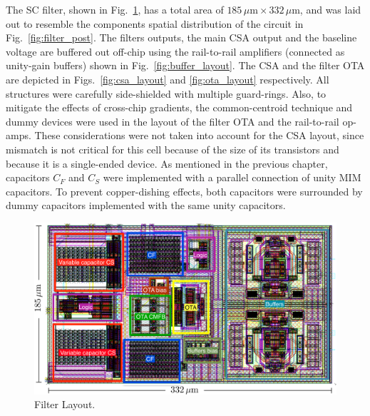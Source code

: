 The SC filter, shown in Fig.~\ref{fig:filter_layout}, has a total area of $185\,\mu\text{m}\times 332\,\mu\text{m}$, and was laid out to resemble the components spatial distribution of the circuit in Fig.~\ref{fig:filter_post}. The filters outputs, the main CSA output and the baseline voltage are buffered out off-chip using the rail-to-rail amplifiers (connected as unity-gain buffers) shown in Fig.~\ref{fig:buffer_layout}. The CSA and the filter OTA are depicted in Figs.~\ref{fig:csa_layout} and \ref{fig:ota_layout} respectively. All structures were carefully side-shielded with multiple guard-rings. Also, to mitigate the effects of cross-chip gradients,  the \mbox{common-centroid} technique and dummy devices were used in the layout of the filter OTA and the rail-to-rail op-amps. These considerations were not taken into account for the CSA layout, since mismatch is not critical for this cell because of the size of its transistors and because it is a single-ended device. As mentioned in the previous chapter, capacitors $C_F$ and $C_S$ were implemented with a parallel connection of unity MIM capacitors. To prevent copper-dishing effects, both capacitors were surrounded by dummy capacitors implemented with the same unity capacitors.

\begin{figure}[!t]
	\centering
	\includegraphics[width=6in]{./Figures/filter_layout}
	\caption{Filter Layout.}\label{fig:filter_layout}
\end{figure}


